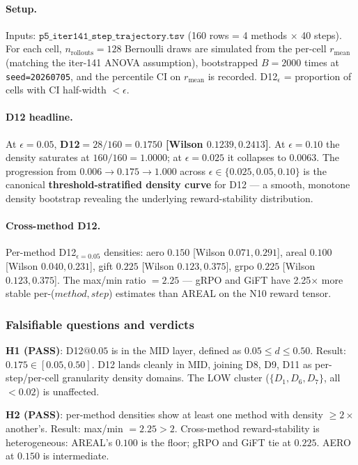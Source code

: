 \documentclass{article}
\begin{document}
\paragraph{Setup.}
Inputs: $\texttt{p5\_iter141\_step\_trajectory.tsv}$ (160 rows = 4 methods
$\times$ 40 steps).  For each cell, $n_{\text{rollouts}} = 128$ Bernoulli
draws are simulated from the per-cell $r_{\text{mean}}$ (matching the
iter-141 ANOVA assumption), bootstrapped $B = 2000$ times at
\texttt{seed=20260705}, and the percentile CI on $r_{\text{mean}}$ is
recorded.  D12$_\epsilon$ = proportion of cells with CI half-width
$< \epsilon$.

\paragraph{D12 headline.} At $\epsilon = 0.05$,
\textbf{D12$ = 28/160 = 0.1750$ [Wilson $0.1239, 0.2413$]}. At
$\epsilon = 0.10$ the density saturates at
$160/160 = 1.0000$; at $\epsilon = 0.025$ it collapses to
$0.0063$. The progression from $0.006 \to 0.175 \to 1.000$ across
$\epsilon \in \{0.025, 0.05, 0.10\}$ is the canonical
\textbf{threshold-stratified density curve} for D12 --- a smooth,
monotone density bootstrap revealing the underlying reward-stability
distribution.

\paragraph{Cross-method D12.} Per-method D12$_{\epsilon=0.05}$ densities:
aero $0.150$ [Wilson $0.071, 0.291$], areal $0.100$ [Wilson $0.040,
0.231$], gift $0.225$ [Wilson $0.123, 0.375$], grpo $0.225$ [Wilson
$0.123, 0.375$]. The max/min ratio $= 2.25$ --- gRPO and GiFT have 2.25$\times$
more stable per-($method, step$) estimates than AREAL on the
N10 reward tensor.

\subsubsection{Falsifiable questions and verdicts}

\textbf{H1 (PASS)}: D12$@0.05$ is in the MID layer, defined as
$0.05 \leq d \leq 0.50$.  Result: $0.175 \in [0.05, 0.50]$.
D12 lands cleanly in MID, joining D8, D9, D11 as per-step/per-cell
granularity density domains. The LOW cluster ($\{D_1, D_6, D_7\}$,
all $< 0.02$) is unaffected.

\textbf{H2 (PASS)}: per-method densities show at least one method with
density $\geq 2 \times$ another's.  Result: max/min $= 2.25 > 2$.
Cross-method reward-stability is heterogeneous: AREAL's
$0.100$ is the floor; gRPO and GiFT tie at $0.225$.  AERO at $0.150$
is intermediate.
\end{document}
